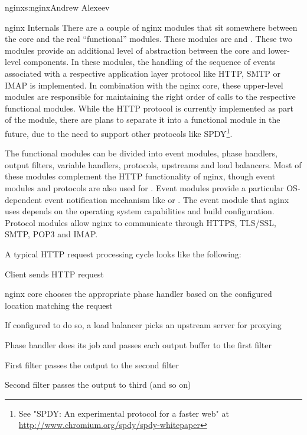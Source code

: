 \begin{aosachapter}{nginx}{s:nginx}{Andrew Alexeev}
\begin{aosasect1}{nginx Internals}
There are a couple of nginx modules that sit somewhere between the
core and the real ``functional'' modules. These modules are
 and . These two modules provide an additional
level of abstraction between the core and lower-level components. In
these modules, the handling of the sequence of events associated with
a respective application layer protocol like HTTP, SMTP or IMAP is
implemented. In combination with the nginx core, these upper-level
modules are responsible for maintaining the right order of calls to
the respective functional modules. While the HTTP protocol is
currently implemented as part of the  module, there are plans
to separate it into a functional module in the future, due to 
the need to support other protocols like SPDY\footnote{See "SPDY: An experimental protocol for a faster web" at \url{http://www.chromium.org/spdy/spdy-whitepaper}}.

The functional modules can be divided into event modules, phase
handlers, output filters, variable handlers, protocols, upstreams and
load balancers. Most of these modules complement the HTTP
functionality of nginx, though event modules and protocols are also
used for . Event modules provide a particular OS-dependent
event notification mechanism like  or .  The
event module that nginx uses depends on the operating system
capabilities and build configuration. Protocol modules allow nginx to
communicate through HTTPS, TLS/SSL, SMTP, POP3 and IMAP.

A typical HTTP request processing cycle looks like the following:

\begin{aosaenumerate}

\item Client sends HTTP request

\item nginx core chooses the appropriate phase handler based on the
  configured location matching the request

\item If configured to do so, a load balancer picks an upstream server
  for proxying

\item Phase handler does its job and passes each output buffer to the first
  filter

\item First filter passes the output to the second filter

\item Second filter passes the output to third (and so on)


\end{aosaenumerate}
\end{aosasect1}
\end{aosachapter}
